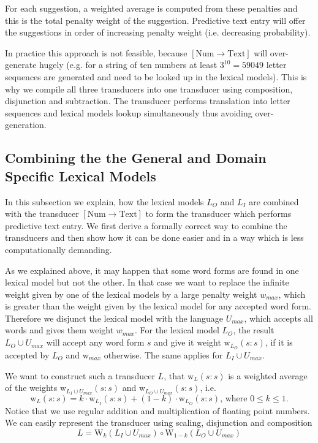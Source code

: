 \documentclass[a4paper,conference]{IEEEtran}
\begin{document}
For each suggestion, a weighted average is computed from these
penalties and this is the total penalty weight of the
suggestion. Predictive text entry will offer the suggestions in order
of increasing penalty weight (i.e. decreasing probability).

In practice this approach is not feasible, because
$[\mathrm{Num}\rightarrow\mathrm{Text}]$ will over-generate hugely
(e.g. for a string of ten numbers at least $3^{10} = 59049$ letter
sequences are generated and need to be looked up in the
lexical models). This is why we compile all three transducers into one
transducer using composition, disjunction and subtraction. The
transducer performs translation into letter sequences and lexical models
lookup simultaneously thus avoiding over-generation.

\subsection{Combining the the General and Domain Specific Lexical Models}

In this subsection we explain, how the lexical models $L_O$ and $L_I$ are
combined with the transducer $[\mathrm{Num}\rightarrow\mathrm{Text}]$
to form the transducer which performs predictive text entry. We first
derive a formally correct way to combine the transducers and then show
how it can be done easier and in a way which is less computationally
demanding.

As we explained above, it may happen that some word forms are found in
one lexical model but not the other. In that case we want to replace the
infinite weight given by one of the lexical models by a large penalty weight
$w_{max}$, which is greater than the weight given by the lexical model for
any accepted word form. Therefore we disjunct the lexical model with the
language $U_{max}$, which accepts all words and gives them weight
$w_{max}$. For the lexical model $L_O$, the result $L_O \cup U_{max}$ will
accept any word form $s$ and give it weight
$\mathrm{w}_{L_O}(s\mathrm{:}s)$, if it is accepted by $L_O$ and
$\mathrm{w}_{max}$ otherwise. The same applies for $L_I \cup U_{max}$.

We want to construct such a transducer $L$, that $\mathrm{w}_L(s\mathrm{:}s)$
is a weighted average of the weights $\mathrm{w}_{L_I \cup U_{max}}(s\mathrm{:}s)$ and
$\mathrm{w}_{L_O \cup U_{max}}(s\mathrm{:}s)$, i.e.
\begin{equation}
  \mathrm{w}_L(s\mathrm{:}s) = k\cdot \mathrm{w}_{L_I}(s\mathrm{:}s) + (1 - k)\cdot \mathrm{w}_{L_O}(s\mathrm{:}s)\text{, where }0\leq k \leq 1\text{.}
\end{equation}
Notice that we use regular addition and multiplication of floating
point numbers. We can easily represent the transducer using scaling, disjunction and composition
\begin{equation}
  L = \mathrm{W}_k(L_I \cup U_{max}) \circ \mathrm{W}_{1-k}(L_O \cup U_{max})
\end{equation}
\end{document}

